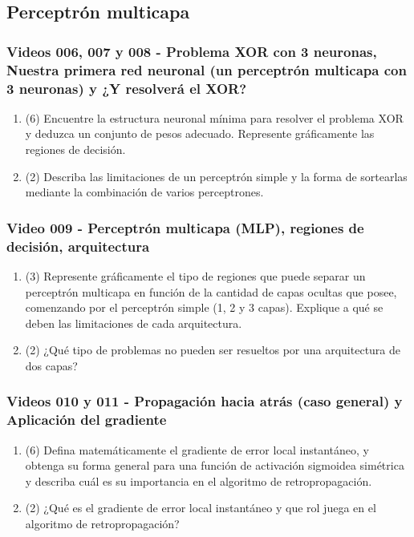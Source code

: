 \documentclass[a4paper,10pt,spanish,oneside]{article}
\begin{document}
\subsection{Perceptrón multicapa}

\subsubsection{Videos 006, 007 y 008 - Problema XOR con 3 neuronas, Nuestra primera red neuronal (un perceptrón multicapa con 3 neuronas) y ¿Y resolverá el XOR?}

\begin{enumerate}
\item (6) Encuentre la estructura neuronal mínima para resolver el problema XOR y deduzca un conjunto de pesos adecuado. Represente gráficamente las regiones de decisión.

\item (2) Describa las limitaciones de un perceptrón simple y la forma de sortearlas mediante la combinación de varios perceptrones.
\end{enumerate}

\subsubsection{Video 009 - Perceptrón multicapa (MLP), regiones de decisión, arquitectura}

\begin{enumerate}
\item (3) Represente gráficamente el tipo de regiones que puede separar un perceptrón multicapa en función de la cantidad de capas ocultas que posee, comenzando por el perceptrón simple (1, 2 y 3 capas). Explique a qué se deben las limitaciones de cada arquitectura.

\item (2) ¿Qué tipo de problemas no pueden ser resueltos por una arquitectura de dos capas?
\end{enumerate}

\subsubsection{Videos 010 y 011 - Propagación hacia atrás (caso general) y Aplicación del gradiente}

\begin{enumerate}
\item (6) Defina matemáticamente el gradiente de error local instantáneo, y obtenga su forma general para una función de activación sigmoidea simétrica y describa cuál es su importancia en el algoritmo de retropropagación.

\item (2) ¿Qué es el gradiente de error local instantáneo y que rol juega en el algoritmo de retropropagación?
\end{enumerate}
\end{document}
